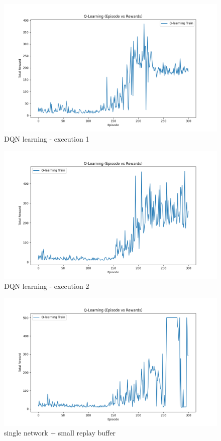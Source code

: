 \documentclass{article}
\begin{document}
\begin{figure}
  \includegraphics[width=\linewidth]{DQN-0003.png}
  \caption{DQN learning - execution 1}
  \label{fig:dqn-3}
\end{figure}

\begin{figure}
  \includegraphics[width=\linewidth]{DQN-0004.png}
  \caption{DQN learning - execution 2}
  \label{fig:dqn-4}
\end{figure}

\begin{figure}
  \includegraphics[width=\linewidth]{DQN-0001.png}
  \caption{single network + small replay buffer}
  \label{fig:dqn-1}
\end{figure}
\end{document}
